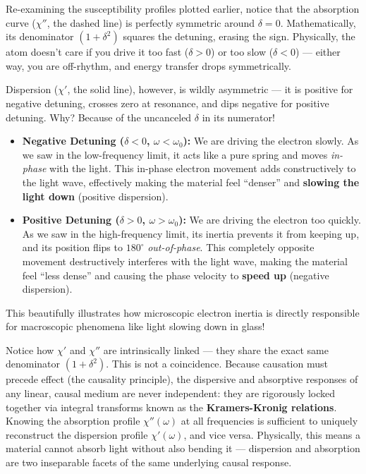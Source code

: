 \begin{keyinsight}
    Re-examining the susceptibility profiles plotted earlier, notice that the absorption curve ($\chi''$, the dashed line) is perfectly symmetric around $\delta = 0$. Mathematically, its denominator $(1+\delta^2)$ squares the detuning, erasing the sign. Physically, the atom doesn't care if you drive it too fast ($\delta > 0$) or too slow ($\delta < 0$) — either way, you are off-rhythm, and energy transfer drops symmetrically.

    Dispersion ($\chi'$, the solid line), however, is wildly asymmetric — it is positive for negative detuning, crosses zero at resonance, and dips negative for positive detuning. Why? Because of the uncanceled $\delta$ in its numerator!
    \begin{itemize}
        \item \textbf{Negative Detuning ($\delta < 0$, $\omega < \omega_0$):} We are driving the electron slowly. As we saw in the low-frequency limit, it acts like a pure spring and moves \emph{in-phase} with the light. This in-phase electron movement adds constructively to the light wave, effectively making the material feel ``denser'' and \textbf{slowing the light down} (positive dispersion).
        \item \textbf{Positive Detuning ($\delta > 0$, $\omega > \omega_0$):} We are driving the electron too quickly. As we saw in the high-frequency limit, its inertia prevents it from keeping up, and its position flips to $180^\circ$ \emph{out-of-phase}. This completely opposite movement destructively interferes with the light wave, making the material feel ``less dense'' and causing the phase velocity to \textbf{speed up} (negative dispersion).
    \end{itemize}
    This beautifully illustrates how microscopic electron inertia is directly responsible for macroscopic phenomena like light slowing down in glass!
\end{keyinsight}

\begin{keyinsight}
    Notice how $\chi'$ and $\chi''$ are intrinsically linked — they share the exact same denominator $(1 + \delta^2)$. This is not a coincidence. Because causation must precede effect (the causality principle), the dispersive and absorptive responses of any linear, causal medium are never independent: they are rigorously locked together via integral transforms known as the \textbf{Kramers-Kronig relations}. Knowing the absorption profile $\chi''(\omega)$ at all frequencies is sufficient to uniquely reconstruct the dispersion profile $\chi'(\omega)$, and vice versa. Physically, this means a material cannot absorb light without also bending it — dispersion and absorption are two inseparable facets of the same underlying causal response.
\end{keyinsight}

